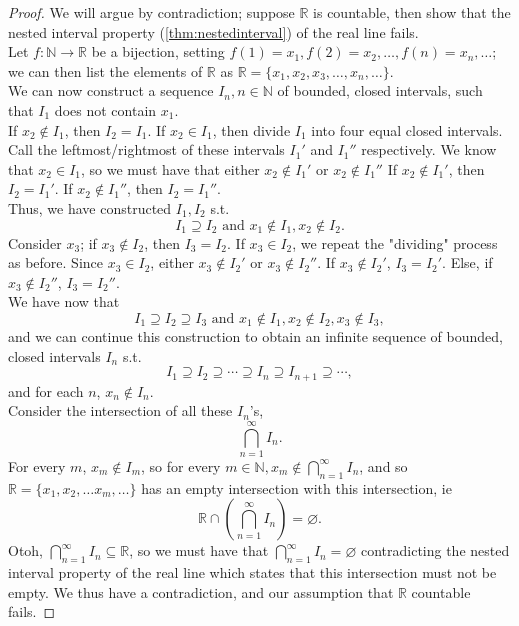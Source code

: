 \documentclass[12pt]{article}
\begin{document}
\begin{proof}
  We will argue by contradiction; suppose $\mathbb{R}$ is countable, then show that the nested interval property (\cref{thm:nestedinterval}) of the real line fails.\\
  Let $f: \mathbb{N} \to \mathbb{R}$ be a bijection, setting $f(1) = x_1, f(2) = x_2, \dots, f(n) = x_n, \dots$; we can then list the elements of $\mathbb{R}$ as $\mathbb{R} = \{x_1, x_2, x_3, \dots, x_n, \dots\}$.\\
  We can now construct a sequence $I_n, n \in \mathbb{N}$ of bounded, closed intervals, such that $I_1$ does not contain $x_1$.\\ If $x_2 \notin I_1$, then $I_2 = I_1$. If $x_2 \in I_1$, then divide $I_1$ into four equal closed intervals.\\
  Call the leftmost/rightmost of these intervals $I_1'$ and $I_1''$ respectively. We know that $x_2 \in I_1$, so we must have that either $x_2 \notin I_1'$ or $x_2 \notin I_1''$ If $x_2 \notin I_1'$, then $I_2 = I_1'$. If $x_2 \notin I_1''$, then $I_2 = I_1''$.\\
  Thus, we have constructed $I_1, I_2$ s.t.\[I_1 \supseteq I_2 \text{ and } x_1 \notin I_1,x_2 \notin I_2.\] Consider $x_3$; if $x_3 \notin I_2$, then $I_3 = I_2$. If $x_3 \in I_2$, we repeat the "dividing" process as before. Since $x_3 \in I_2$, either $x_3 \notin I_2'$ or $x_3 \notin I_2''$. If $x_3 \notin I_2'$, $I_3 = I_2'$. Else, if $x_3 \notin I_2''$, $I_3 = I_2''$.\\
  We have now that \[I_1 \supseteq I_2 \supseteq I_3 \text{ and } x_1 \notin I_1, x_2 \notin I_2, x_3 \notin I_3,\] and we can continue this construction to obtain an infinite sequence of bounded, closed intervals $I_n$ s.t. $$I_1 \supseteq I_2 \supseteq \cdots \supseteq I_n \supseteq I_{n+1} \supseteq \cdots,$$ and for each $n$, $x_n \notin I_n$.\\
  Consider the intersection of all these $I_n$'s,$$\bigcap_{n=1}^\infty I_n.$$ For every $m$, $x_m \notin I_m$, so for every $m \in \mathbb{N}, x_m \notin \bigcap_{n=1}^\infty I_n$, and so $\mathbb{R} = \{x_1, x_2, \dots x_m, \dots\}$ has an empty intersection with this intersection, ie
  $$\mathbb{R} \cap \left( \bigcap_{n=1}^\infty I_n \right) = \varnothing.$$ Otoh, $\bigcap_{n=1}^\infty I_n \subseteq \mathbb{R}$, so we must have that $\bigcap_{n=1}^\infty I_n = \varnothing$ contradicting the nested interval property of the real line which states that this intersection must not be empty. We thus have a contradiction, and our assumption that $\mathbb{R}$ countable fails. \footnotemark
\end{proof}
\end{document}

